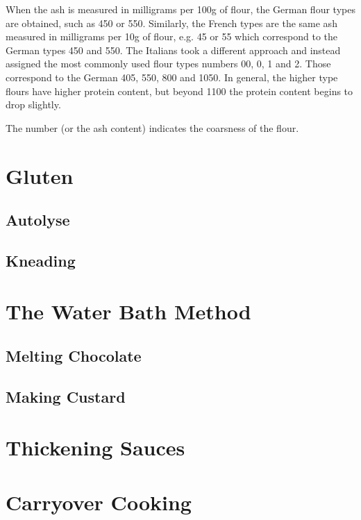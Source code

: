 When the ash is measured in milligrams per 100g of flour, the German flour
types are obtained, such as 450 or 550. Similarly, the French types are the
same ash measured in milligrams per 10g of flour, e.g. 45 or 55 which
correspond to the German types 450 and 550. The Italians took a different
approach and instead assigned the most commonly used flour types numbers 00, 0,
1 and 2. Those correspond to the German 405, 550, 800 and 1050. In general, the
higher type flours have higher protein content, but beyond 1100 the protein
content begins to drop slightly.

The number (or the ash content) indicates the coarsness of the flour.

\section{Gluten}
\subsection{Autolyse}
\subsection{Kneading}

\section{The Water Bath Method}
\subsection{Melting Chocolate}
\subsection{Making Custard}

\section{Thickening Sauces}

\section{Carryover Cooking}
